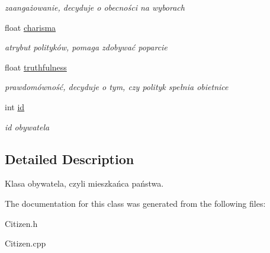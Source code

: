 \begin{DoxyCompactItemize}
\begin{DoxyCompactList}\small\item\em zaangażowanie, decyduje o obecności na wyborach \end{DoxyCompactList}\item 
\hypertarget{classCitizen_a47e3e2fe352666e6b1d6182fc918188a}{float \hyperlink{classCitizen_a47e3e2fe352666e6b1d6182fc918188a}{charisma}}\label{classCitizen_a47e3e2fe352666e6b1d6182fc918188a}

\begin{DoxyCompactList}\small\item\em atrybut polityków, pomaga zdobywać poparcie \end{DoxyCompactList}\item 
\hypertarget{classCitizen_aba65cc18df9e1e970eb3ec146a524858}{float \hyperlink{classCitizen_aba65cc18df9e1e970eb3ec146a524858}{truthfulness}}\label{classCitizen_aba65cc18df9e1e970eb3ec146a524858}

\begin{DoxyCompactList}\small\item\em prawdomówność, decyduje o tym, czy polityk spełnia obietnice \end{DoxyCompactList}\item 
\hypertarget{classCitizen_a1217745e0ab4398bd700db2f3fc627b8}{int \hyperlink{classCitizen_a1217745e0ab4398bd700db2f3fc627b8}{id}}\label{classCitizen_a1217745e0ab4398bd700db2f3fc627b8}

\begin{DoxyCompactList}\small\item\em id obywatela \end{DoxyCompactList}\end{DoxyCompactItemize}


\subsection{Detailed Description}
Klasa obywatela, czyli mieszkańca państwa. 

The documentation for this class was generated from the following files\+:\begin{DoxyCompactItemize}
\item 
Citizen.\+h\item 
Citizen.\+cpp\end{DoxyCompactItemize}
